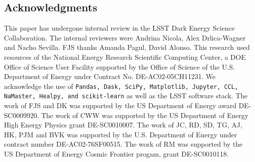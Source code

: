 \documentclass[\docopts]{\docclass}
\begin{document}
\subsection*{Acknowledgments}
This paper has undergone internal review in the LSST Dark Energy Science Collaboration. The internal reviewers were Andrina Nicola, Alex Drlica-Wagner and Nacho Sevilla.
FJS thanks Amanda Pagul, David Alonso. This research used resources of the National Energy Research Scientific Computing Center, a DOE Office of Science User Facility supported by the Office of Science of the U.S. Department of Energy under Contract No. DE-AC02-05CH11231. We acknowledge the use of \texttt{Pandas, Dask, SciPy, Matplotlib, Jupyter, CCL, NaMaster, Healpy, and scikit-learn} as well as the LSST software stack.
The work of FJS and DK was supported by the US Department of Energy award DE-SC0009920. The work of CWW was supported by the US Department of Energy High Energy Physics grant DE-SC0010007. The work of JC, RD, SD, TG, AJ, HK, PJM and BVK was supported by the U.S. Department of Energy under contract number DE-AC02-76SF00515. The work of RM was supported by the US Department of Energy Cosmic Frontier progam, grant DE-SC0010118. 







\end{document}
